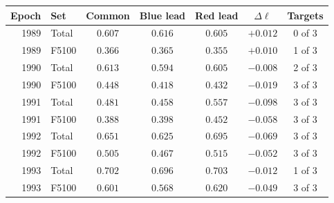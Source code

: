 \begin{tabular}{rlccccc}
\toprule
Epoch & Set & Common & Blue lead & Red lead & $\Delta\ell$ & Targets \\
\midrule
1989 & Total & $0.607$ & $0.616$ & $0.605$ & $+0.012$ & 0 of 3 \\
1989 & F5100 & $0.366$ & $0.365$ & $0.355$ & $+0.010$ & 1 of 3 \\
1990 & Total & $0.613$ & $0.594$ & $0.605$ & $-0.008$ & 2 of 3 \\
1990 & F5100 & $0.448$ & $0.418$ & $0.432$ & $-0.019$ & 3 of 3 \\
1991 & Total & $0.481$ & $0.458$ & $0.557$ & $-0.098$ & 3 of 3 \\
1991 & F5100 & $0.388$ & $0.398$ & $0.452$ & $-0.058$ & 3 of 3 \\
1992 & Total & $0.651$ & $0.625$ & $0.695$ & $-0.069$ & 3 of 3 \\
1992 & F5100 & $0.505$ & $0.467$ & $0.515$ & $-0.052$ & 3 of 3 \\
1993 & Total & $0.702$ & $0.696$ & $0.703$ & $-0.012$ & 1 of 3 \\
1993 & F5100 & $0.601$ & $0.568$ & $0.620$ & $-0.049$ & 3 of 3 \\
\bottomrule
\end{tabular}
